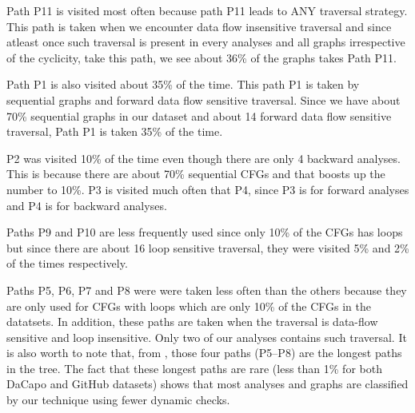 Path P11 is visited most often because path P11 leads to ANY traversal strategy. This path is taken when we encounter data flow insensitive traversal and since atleast once such traversal is present in every analyses and all graphs irrespective of the cyclicity, take this path, we see about 36\% of the graphs takes Path P11. 

Path P1 is also visited about 35\% of the time. This path P1 is taken by sequential graphs and forward data flow sensitive traversal. Since we have about 70\% sequential graphs in our dataset and about 14 forward data flow sensitive traversal, Path P1 is taken 35\% of the time. 

P2 was visited 10\% of the time even though there are only 4 backward analyses. This is because there are about 70\% sequential CFGs and that boosts up the number to 10\%. 
P3 is visited much often that P4, since P3 is for forward analyses and P4 is for backward analyses. 

Paths P9 and P10 are less frequently used since only 10\% of the CFGs has loops but since there are about 16 loop sensitive traversal, they were visited 5\% and 2\% of the times respectively. 

Paths P5, P6, 
P7 and P8 were were taken less often than the others because they are only 
used for CFGs with loops which are only 10\% of the CFGs in the datatsets.
In addition, these paths are taken when the traversal is data-flow sensitive 
and loop insensitive. Only two of our analyses contains such traversal.
%
It is also worth to note that, from , those four paths 
(P5--P8) are the longest paths in the tree. The fact that these longest paths 
are rare (less than 1\% for both DaCapo and GitHub datasets) shows that 
most analyses and graphs are classified by our technique using fewer dynamic 
checks.


